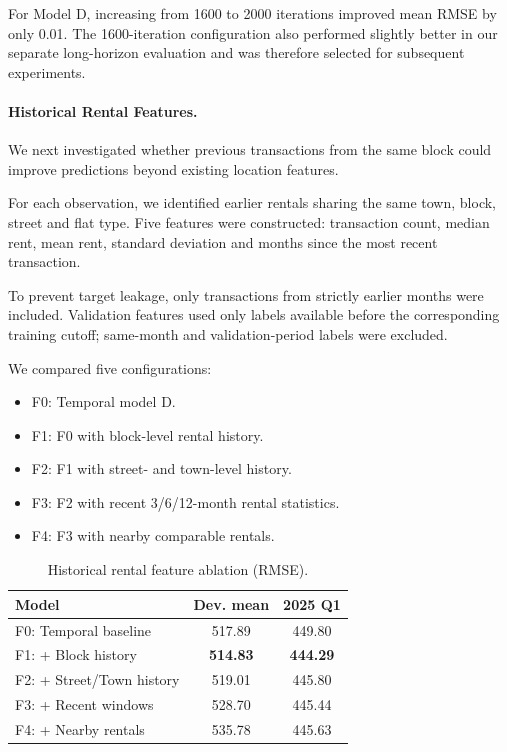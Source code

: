 \documentclass[10pt,a4paper]{article}
\begin{document}
For Model D, increasing from 1600 to 2000 iterations improved mean RMSE by only 0.01. The 1600-iteration configuration also performed slightly better in our separate long-horizon evaluation and was therefore selected for subsequent experiments.

\paragraph{Historical Rental Features.}
We next investigated whether previous transactions from the same block could improve predictions beyond existing location features.

For each observation, we identified earlier rentals sharing the same town, block, street and flat type. Five features were constructed: transaction count, median rent, mean rent, standard deviation and months since the most recent transaction.

To prevent target leakage, only transactions from strictly earlier months were included. Validation features used only labels available before the corresponding training cutoff; same-month and validation-period labels were excluded.

We compared five configurations:
\begin{itemize}
    \setlength{\itemsep}{0pt}
    \item F0: Temporal model D.
    \item F1: F0 with block-level rental history.
    \item F2: F1 with street- and town-level history.
    \item F3: F2 with recent 3/6/12-month rental statistics.
    \item F4: F3 with nearby comparable rentals.
\end{itemize}

\begin{table}[t]
\centering
\caption{Historical rental feature ablation (RMSE).}
\label{tab:f1_history}
\small
\begin{tabular}{lcc}
\hline
Model & Dev. mean & 2025 Q1 \\
\hline
F0: Temporal baseline & 517.89 & 449.80 \\
F1: + Block history & \textbf{514.83} & \textbf{444.29} \\
F2: + Street/Town history & 519.01 & 445.80 \\
F3: + Recent windows & 528.70 & 445.44 \\
F4: + Nearby rentals & 535.78 & 445.63 \\
\hline
\end{tabular}
\end{table}
\end{document}
